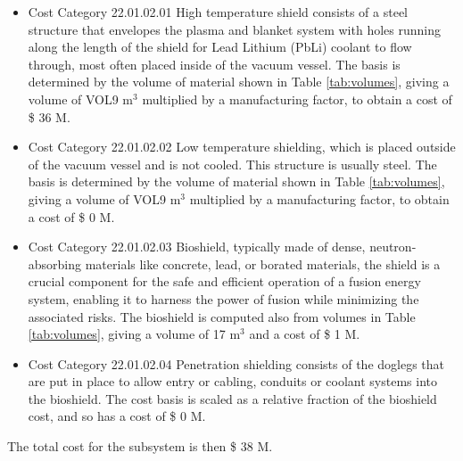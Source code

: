 \begin{itemize}
    \item Cost Category 22.01.02.01 High temperature shield consists of a steel structure that envelopes the plasma and blanket system with holes running along the length of the shield for Lead Lithium (PbLi) coolant to flow through, most often placed inside of the vacuum vessel. The basis is determined by the volume of material shown in Table \ref{tab:volumes}, giving a volume of VOL9  m$^{3}$ multiplied by a manufacturing factor, to obtain a cost of \$ 36 M. %
    \item Cost Category 22.01.02.02 Low temperature shielding, which is placed outside of the vacuum vessel and is not cooled.  This structure is usually steel.  The basis is determined by the volume of material shown in Table \ref{tab:volumes}, giving a volume of VOL9  m$^{3}$ multiplied by a manufacturing factor, to obtain a cost of \$ 0 M.
    \item Cost Category 22.01.02.03 Bioshield, typically made of dense, neutron-absorbing materials like concrete, lead, or borated materials, the shield is a crucial component for the safe and efficient operation of a fusion energy system, enabling it to harness the power of fusion while minimizing the associated risks.  The bioshield is computed also from volumes in Table \ref{tab:volumes}, giving a volume of 17 m$^{3}$ and a cost of \$ 1 M. 
    \item Cost Category 22.01.02.04 Penetration shielding consists of the doglegs that are put in place to allow entry or cabling, conduits or coolant systems into the bioshield.  The cost basis is scaled as a relative fraction of the bioshield cost, and so has a cost of \$ 0 M.
\end{itemize}

The total cost for the subsystem is then \$ 38 M.




